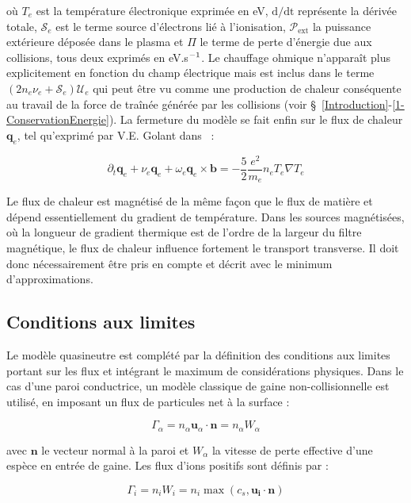 \begin{refsection}
où $T_e$ est la température électronique exprimée en eV, $\text{d/dt}$
représente la dérivée totale, $\mathcal{S}_e$ est le terme source d'électrons
lié à l'ionisation, $\mathcal{P}_\text{ext}$ la puissance extérieure déposée
dans le plasma et $\Pi$ le terme de perte d'énergie due aux collisions, tous
deux exprimés en eV.s$^{{-1}}$.
Le chauffage ohmique n'apparaît plus explicitement en fonction du champ électrique mais est
inclus dans le terme $(2n_e\nu_e+\mathcal{S}_e)\mathcal{U}_e$ qui peut être vu
comme une production de chaleur conséquente au travail de la force de traînée générée par
les collisions (voir \S~\ref{Introduction}-\ref{1-ConservationEnergie}).
La fermeture du modèle se fait enfin sur le flux de chaleur $\mathbf{q}_e$, tel qu'exprimé par V.E. Golant
dans~\parencite{Golant} :

\begin{equation}
\partial_t \mathbf{q}_e + \nu_e\mathbf{q}_e+\omega_e\mathbf{q}_e\times\mathbf{b} =
-\frac{5}{2}\frac{e^2}{m_e}n_eT_e\nabla T_e
\end{equation}

Le flux de chaleur est magnétisé de la même façon que le flux de matière et
dépend essentiellement du gradient de température. Dans les sources magnétisées,
où la longueur de gradient thermique est de l'ordre de la largeur
du filtre magnétique, le flux de chaleur influence fortement le transport
transverse. Il doit donc nécessairement être pris en compte et décrit
avec le minimum d'approximations.

\subsection{Conditions aux limites}
Le modèle quasineutre est complété par la
définition des conditions aux limites portant sur les flux et intégrant le
maximum de considérations physiques. Dans le cas d'une paroi conductrice, un
modèle classique de gaine non-collisionnelle est utilisé, en imposant un flux
de particules net à la surface :

\begin{equation*}
	\Gamma_\alpha=n_\alpha\mathbf u_\alpha\cdot \mathbf n=n_\alpha W_\alpha
\end{equation*} 

avec $\mathbf{n}$ le vecteur normal à la paroi et $W_\alpha$ la vitesse de perte
effective d'une espèce en entrée de gaine. Les flux d'ions positifs sont définis
par :

\begin{equation}
\Gamma_i=n_iW_i=n_i\max\left(c_s,\mathbf{u_i}\cdot\mathbf{n}\right)
\end{equation}


\end{refsection}
